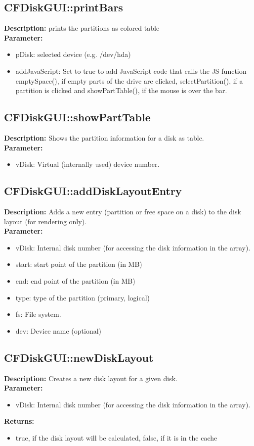 \subsection{CFDiskGUI::printBars}
\textbf{Description:} prints the partitions as colored table\\
\textbf{Parameter:}
\begin{itemize}
\item pDisk: selected device (e.g. /dev/hda)
\item addJavaScript: Set to true to add JavaScript code that calls the JS function emptySpace(), if empty parts of the drive are clicked, selectPartition(), if a partition is clicked and showPartTable(), if the mouse is over the bar.
\end{itemize}

\subsection{CFDiskGUI::showPartTable}
\textbf{Description:} Shows the partition information for a disk as table.\\
\textbf{Parameter:}
\begin{itemize}
\item vDisk: Virtual (internally used) device number.
\end{itemize}

\subsection{CFDiskGUI::addDiskLayoutEntry}
\textbf{Description:} Adds a new entry (partition or free space on a disk) to the disk layout (for rendering only).\\
\textbf{Parameter:}
\begin{itemize}
\item vDisk: Internal disk number (for accessing the disk information in the array).
\item start: start point of the partition (in MB)
\item end: end point of the partition (in MB)
\item type: type of the partition (primary, logical)
\item fs: File system.
\item dev: Device name (optional)
\end{itemize}

\subsection{CFDiskGUI::newDiskLayout}
\textbf{Description:} Creates a new disk layout for a given disk.\\
\textbf{Parameter:}
\begin{itemize}
\item vDisk: Internal disk number (for accessing the disk information in the array).
\end{itemize}
\textbf{Returns:}
\begin{itemize}
\item true, if the disk layout will be calculated, false, if it is in the cache 
\end{itemize}

